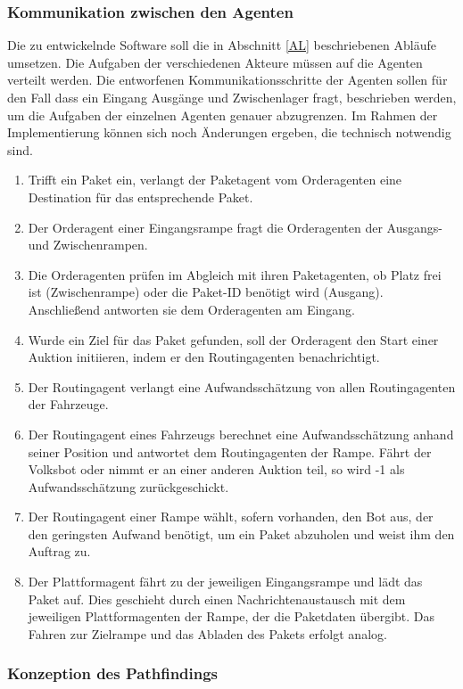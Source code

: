 \subsubsection{Kommunikation zwischen den Agenten}
Die zu entwickelnde Software soll die in Abschnitt \ref{AL} beschriebenen Abläufe umsetzen. Die Aufgaben der verschiedenen Akteure müssen auf die Agenten verteilt werden. Die entworfenen Kommunikationsschritte der Agenten sollen für den Fall dass ein Eingang Ausgänge und Zwischenlager fragt, beschrieben werden, um die Aufgaben der einzelnen Agenten genauer abzugrenzen. Im Rahmen der Implementierung können sich noch Änderungen ergeben, die technisch notwendig sind. 
\begin{enumerate}
\item Trifft ein Paket ein, verlangt der Paketagent vom Orderagenten eine Destination für das entsprechende Paket.
\item Der Orderagent einer Eingangsrampe fragt die Orderagenten der Ausgangs- und Zwischenrampen.
\item Die Orderagenten prüfen im Abgleich mit ihren Paketagenten, ob Platz frei ist (Zwischenrampe) oder die Paket-ID benötigt wird (Ausgang). Anschließend antworten sie dem Orderagenten am Eingang.  
\item Wurde ein Ziel für das Paket gefunden, soll der Orderagent den Start einer Auktion initiieren, indem er den Routingagenten benachrichtigt. 
\item Der Routingagent verlangt eine Aufwandsschätzung von allen Routingagenten der Fahrzeuge.
\item Der Routingagent eines Fahrzeugs berechnet eine Aufwandsschätzung anhand seiner Position und antwortet dem Routingagenten der Rampe. Fährt der Volksbot oder nimmt er an einer anderen Auktion teil, so wird -1 als Aufwandsschätzung zurückgeschickt.
\item Der Routingagent einer Rampe wählt, sofern vorhanden, den Bot aus, der den geringsten Aufwand benötigt, um ein Paket abzuholen und weist ihm den Auftrag zu.
\item Der Plattformagent fährt zu der jeweiligen Eingangsrampe und lädt das Paket auf. Dies geschieht durch einen Nachrichtenaustausch mit dem jeweiligen Plattformagenten der Rampe, der die Paketdaten übergibt. Das Fahren zur Zielrampe und das Abladen des Pakets erfolgt analog. 
\end{enumerate}
\subsubsection{Konzeption des Pathfindings}

